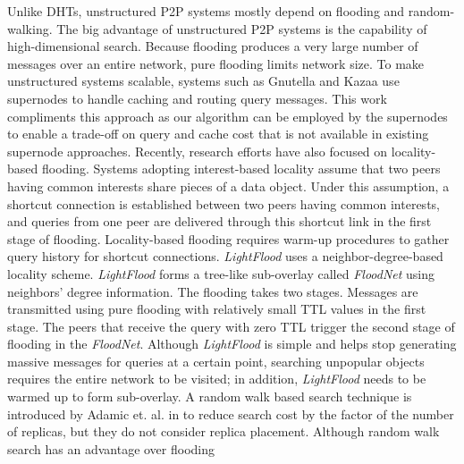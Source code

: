 \documentclass[conference]{IEEEtran}
\begin{document}
Unlike DHTs, unstructured P2P systems mostly depend on flooding and random-walking.
The big advantage of unstructured P2P systems 
is the capability of high-dimensional search.
Because flooding produces a very large number of
messages over an entire network, pure flooding limits network size. 
To make unstructured systems scalable, systems such as Gnutella and
Kazaa use supernodes to handle caching and routing query messages.
This work compliments this approach as our algorithm can be employed
by the supernodes to enable a trade-off on query and cache cost that
is not available in existing supernode approaches.
Recently, research efforts have also focused on locality-based flooding. Systems 
adopting interest-based locality\cite{Guo05,SMZ03} assume that 
two peers having common interests share pieces of a data object. 
Under this assumption, a shortcut 
connection is established between two peers having common interests, 
and queries from one peer are delivered through this 
shortcut link in the first stage of flooding. 
Locality-based flooding requires warm-up procedures to gather query 
history for shortcut connections. 
\textit{LightFlood}\cite{JiangGZW08} uses a neighbor-degree-based locality scheme. 
\textit{LightFlood} forms a tree-like sub-overlay called 
\textit{FloodNet} using neighbors' degree information. 
The flooding takes two stages.
Messages are transmitted using pure flooding with relatively small TTL values 
in the first stage. The peers that receive the query with zero TTL trigger 
the second stage of flooding in the \textit{FloodNet}. Although 
\textit{LightFlood} is simple and helps stop generating massive messages 
for queries at a certain point, searching unpopular objects requires  
the entire network to be visited; in addition, \textit{LightFlood} needs to 
be warmed up to form sub-overlay.  
A random walk based search technique is introduced by Adamic et. al. 
in \cite{alph:powerlaw01} to reduce search cost by the factor of 
the number of replicas, but they do not consider replica placement. 
Although random walk search has an advantage over flooding
\end{document}
